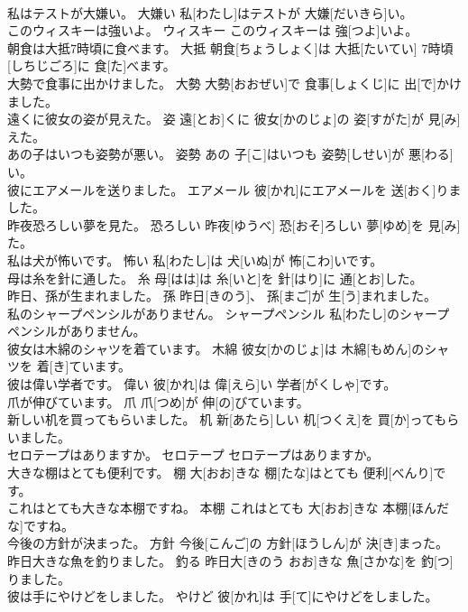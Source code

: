 \documentclass[8pt]{extreport}
\begin{document}
\begin{CJK}{UTF8}{min}
\\	私はテストが大嫌い。	大嫌い	私[わたし]はテストが 大嫌[だいきら]い。	
\\	このウィスキーは強いよ。	ウィスキー	このウィスキーは 強[つよ]いよ。	
\\	朝食は大抵7時頃に食べます。	大抵	朝食[ちょうしょく]は 大抵[たいてい] 7時頃[しちじごろ]に 食[た]べます。	
\\	大勢で食事に出かけました。	大勢	大勢[おおぜい]で 食事[しょくじ]に 出[で]かけました。	
\\	遠くに彼女の姿が見えた。	姿	遠[とお]くに 彼女[かのじょ]の 姿[すがた]が 見[み]えた。	
\\	あの子はいつも姿勢が悪い。	姿勢	あの 子[こ]はいつも 姿勢[しせい]が 悪[わる]い。	
\\	彼にエアメールを送りました。	エアメール	彼[かれ]にエアメールを 送[おく]りました。	
\\	昨夜恐ろしい夢を見た。	恐ろしい	昨夜[ゆうべ] 恐[おそ]ろしい 夢[ゆめ]を 見[み]た。	
\\	私は犬が怖いです。	怖い	私[わたし]は 犬[いぬ]が 怖[こわ]いです。	
\\	母は糸を針に通した。	糸	母[はは]は 糸[いと]を 針[はり]に 通[とお]した。	
\\	昨日、孫が生まれました。	孫	昨日[きのう]、 孫[まご]が 生[う]まれました。	
\\	私のシャープペンシルがありません。	シャープペンシル	私[わたし]のシャープペンシルがありません。	
\\	彼女は木綿のシャツを着ています。	木綿	彼女[かのじょ]は 木綿[もめん]のシャツを 着[き]ています。	
\\	彼は偉い学者です。	偉い	彼[かれ]は 偉[えら]い 学者[がくしゃ]です。	
\\	爪が伸びています。	爪	爪[つめ]が 伸[の]びています。	
\\	新しい机を買ってもらいました。	机	新[あたら]しい 机[つくえ]を 買[か]ってもらいました。	
\\	セロテープはありますか。	セロテープ	セロテープはありますか。	
\\	大きな棚はとても便利です。	棚	大[おお]きな 棚[たな]はとても 便利[べんり]です。	
\\	これはとても大きな本棚ですね。	本棚	これはとても 大[おお]きな 本棚[ほんだな]ですね。	
\\	今後の方針が決まった。	方針	今後[こんご]の 方針[ほうしん]が 決[き]まった。	
\\	昨日大きな魚を釣りました。	釣る	昨日大[きのう おお]きな 魚[さかな]を 釣[つ]りました。	
\\	彼は手にやけどをしました。	やけど	彼[かれ]は 手[て]にやけどをしました。	

\end{CJK}
\end{document}
